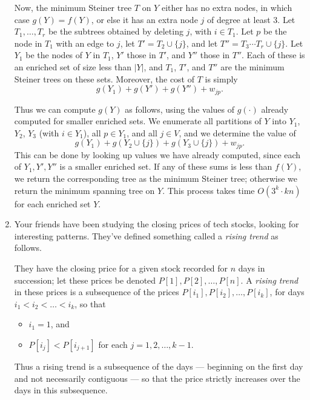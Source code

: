\documentclass[12pt]{article}
\begin{document}
\begin{enumerate}
{Now, the minimum Steiner tree $T$ on $Y$ either has no extra nodes,
in which case $g(Y) = f(Y)$, or else it has an
extra node $j$ of degree at least $3$.
Let $T_1, \ldots, T_r$ be the subtrees obtained by
deleting $j$, with $i \in T_1$.
Let $p$ be the node in $T_1$ with an edge to $j$,
let $T' = T_2 \cup \{j\}$, and let 
$T'' = T_3 \cdots T_r \cup \{j\}$.
Let $Y_1$ be the nodes of $Y$ in $T_1$,
$Y'$ those in $T'$, and $Y''$ those in $T''$.
Each of these is an enriched set of size less than $|Y|$,
and $T_1$, $T'$, and $T''$ are the minimum Steiner trees on these sets.
Moreover, the cost of $T$ is simply
$$g(Y_1) + g(Y') + g(Y'') + w_{jp}.$$

Thus we can compute $g(Y)$ as follows, using
the values of $g(\cdot)$ already computed for smaller enriched sets.
We enumerate
all partitions of $Y$ into $Y_1$, $Y_2$, $Y_3$
(with $i \in Y_1$),
all $p \in Y_1$, and all $j \in V$, and we determine the value of 
$$g(Y_1) + g(Y_2 \cup \{j\}) + g(Y_3 \cup \{j\}) + w_{jp}.$$
This can be done by looking up values we have already
computed, since each of $Y_1, Y', Y''$ is a smaller enriched set.
If any of these sums is less than $f(Y)$, we return 
the corresponding tree as the minimum Steiner tree;
otherwise we return the minimum spanning tree on $Y$.
This process takes time $O(3^k \cdot kn)$ for each enriched set $Y$.

}




\item

Your friends have been studying the closing prices of tech stocks,
looking for interesting patterns.
They've defined something called a {\em rising trend} as follows.

They have the closing price for a given stock recorded for
$n$ days in succession;
let these prices be denoted $P[1], P[2], \ldots, P[n]$.
A {\em rising trend} in these prices is a subsequence
of the prices $P[i_1], P[i_2], \ldots, P[i_k]$,
for days $i_1 < i_2 < \ldots < i_k$, so that
\begin{itemize}
\item $i_1 = 1$, and
\item $P[i_j] < P[i_{j+1}]$ for each $j = 1, 2, \ldots, k-1$.
\end{itemize}
Thus a rising trend is a subsequence of the days
--- beginning on the first day and not necessarily contiguous ---
so that the price strictly increases over the days
in this subsequence.


\end{enumerate}
\end{document}
